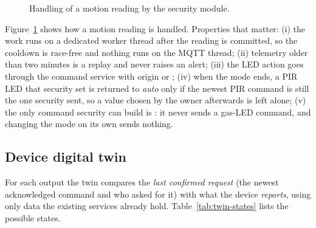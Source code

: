 \documentclass[12pt,a4paper,oneside]{report}
\newcommand{\code}[1]{\texttt{\detokenize{#1}}}
\begin{document}
\begin{figure}[H]
\centering
{}
\caption{Handling of a motion reading by the security module.}
\label{fig:security-flow}
\end{figure}

Figure~\ref{fig:security-flow} shows how a motion reading is handled. Properties that matter: (i) the work runs on a dedicated worker thread after the reading is committed, so the cooldown is race-free and nothing runs on the MQTT thread; (ii) telemetry older than two minutes is a replay and never raises an alert; (iii) the LED action goes through the command service with origin \code{security:away} or \code{security:night}; (iv) when the mode ends, a PIR LED that security set is returned to \emph{auto} only if the newest PIR command is still the one security sent, so a value chosen by the owner afterwards is left alone; (v) the only command security can build is \code{set_pir_led}: it never sends a gas-LED command, and changing the mode on its own sends nothing.

\subsection{Device digital twin}
For each output the twin compares the \emph{last confirmed request} (the newest acknowledged command and who asked for it) with what the device \emph{reports}, using only data the existing services already hold. Table~\ref{tab:twin-states} lists the possible states.
\end{document}
